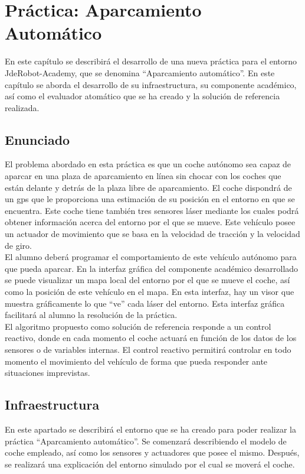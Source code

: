 \chapter{Práctica: Aparcamiento Automático}\label{cap.autoparking}
En este capítulo se describirá el desarrollo de una nueva práctica para el entorno JdeRobot-Academy, que se denomina ``Aparcamiento automático''. En este capítulo se aborda el desarrollo de su infraestructura, su componente académico, así como el evaluador atomático que se ha creado y la solución de referencia realizada.  

\section{Enunciado}
El problema abordado en esta práctica es que un coche autónomo sea capaz de aparcar en una plaza de aparcamiento en línea sin chocar con los coches que están delante y detrás de la plaza libre de aparcamiento. El coche dispondrá de un \acrshort{gps} que le proporciona una estimación de su posición en el entorno en que se encuentra. Este coche tiene también tres sensores láser mediante los cuales podrá obtener información acerca del entorno por el que se mueve. Este vehículo posee un actuador de movimiento que se basa en la velocidad de tracción y la velocidad de giro.\\

El alumno deberá programar el comportamiento de este vehículo autónomo para que pueda aparcar. En la interfaz gráfica del componente académico desarrollado se puede visualizar un mapa local del entorno por el que se mueve el coche, así como la posición de este vehículo en el mapa. En esta interfaz, hay un visor que muestra gráficamente lo que ``ve'' cada láser del entorno. Esta interfaz gráfica facilitará al alumno la resolución de la práctica.\\

El algoritmo propuesto como solución de referencia responde a un control reactivo, donde en cada momento el coche actuará en función de los datos de los sensores o de variables internas. El control reactivo permitirá controlar en todo momento el movimiento del vehículo de forma que pueda responder ante situaciones imprevistas.

\section{Infraestructura}

En este apartado se describirá el entorno que se ha creado para poder realizar la práctica ``Aparcamiento automático''. Se comenzará describiendo el modelo de coche empleado, así como los sensores y actuadores que posee el mismo. Después, se realizará una explicación del entorno simulado por el cual se moverá el coche.


